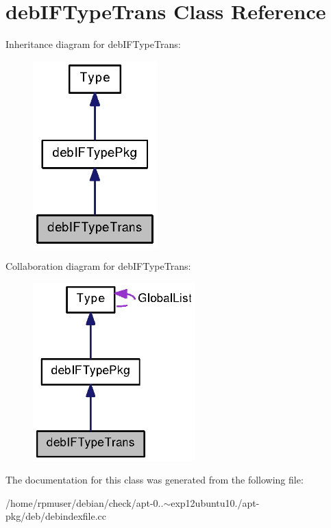 \section{deb\-I\-F\-Type\-Trans \-Class \-Reference}
\label{classdebIFTypeTrans}


\-Inheritance diagram for deb\-I\-F\-Type\-Trans\-:
\nopagebreak
\begin{figure}[H]
\begin{center}
\leavevmode
\includegraphics[width=136pt]{classdebIFTypeTrans__inherit__graph}
\end{center}
\end{figure}


\-Collaboration diagram for deb\-I\-F\-Type\-Trans\-:
\nopagebreak
\begin{figure}[H]
\begin{center}
\leavevmode
\includegraphics[width=177pt]{classdebIFTypeTrans__coll__graph}
\end{center}
\end{figure}


\-The documentation for this class was generated from the following file\-:\begin{DoxyCompactItemize}
\item 
/home/rpmuser/debian/check/apt-\/0..$\sim$exp12ubuntu10./apt-\/pkg/deb/debindexfile.\-cc\end{DoxyCompactItemize}
